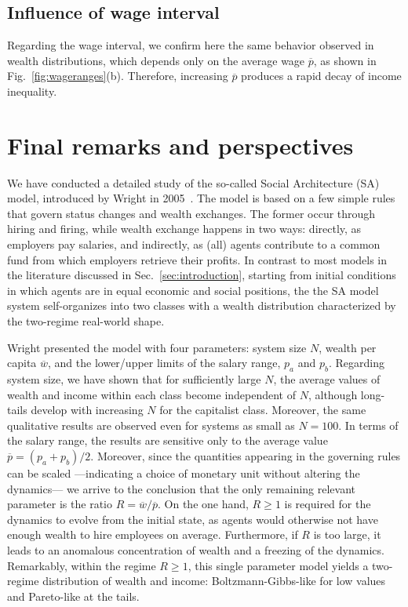 \documentclass[11pt,a4paper]{revtex4-1}
\begin{document}
\subsection{Influence of  wage interval}

Regarding the wage interval, we confirm here the same behavior observed in wealth distributions, which depends only on the average wage $\overline{p}$, as shown in Fig.~\ref{fig:wageranges}(b).
%
Therefore,  increasing $\overline{p}$ produces a rapid decay of income inequality.  


\section{Final remarks and perspectives}
\label{sec:final}
We have conducted a detailed study of the so-called Social Architecture (SA) model, introduced by Wright in 2005~\cite{WRIGHT2005589}.
The model is based on a few simple rules that govern status changes and wealth exchanges. 
The former occur through hiring and firing, while wealth exchange happens in two ways: directly, as employers pay salaries, and indirectly, as (all) agents contribute to a common fund from which employers retrieve their profits.  In contrast to most models in the literature discussed in Sec.~\ref{sec:introduction}, starting from initial conditions in which agents are in  equal economic and social positions, the the SA model system self-organizes into two classes with a wealth distribution characterized by the two-regime real-world shape. 

Wright presented the model with four parameters: system size $N$, wealth per capita $\overline{w}$, and the lower/upper limits of the salary range, $p_a$ and $p_b$.  
Regarding system size, we have shown that for sufficiently large $N$, the average values of wealth and income within each class become independent of $N$, although long-tails develop with increasing $N$ for the capitalist class. Moreover,  the same qualitative results are observed even for systems as small as $N=100$. 
In terms of the salary range, the results are sensitive only to the average value $\overline p = (p_a+p_b)/2$.
%
Moreover, since the quantities appearing in the governing rules can be scaled ---indicating a choice of monetary unit without altering the dynamics--- we arrive to the conclusion that the only remaining relevant parameter is the ratio $R=\overline{w}/\overline{p}$. On the one hand, $R\geq1$ is required for the dynamics to evolve from the initial state, as agents would otherwise not have enough wealth to hire employees on average. Furthermore, if $R$ is too large, it leads to an anomalous concentration of wealth and a freezing of the dynamics. Remarkably, within the regime $R\geq1$, this single parameter model yields a two-regime distribution of wealth and income: Boltzmann-Gibbs-like for low values and Pareto-like at the tails.
\end{document}
